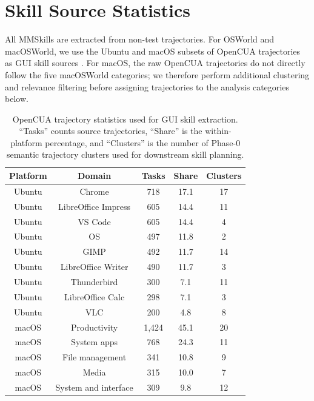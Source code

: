 \section{Skill Source Statistics}
\label{app:skill-source-statistics}

All MMSkills are extracted from non-test trajectories. For OSWorld and macOSWorld, we use the Ubuntu and macOS subsets of OpenCUA trajectories as GUI skill sources \citep{wang2025opencuaopenfoundationscomputeruse}. For macOS, the raw OpenCUA trajectories do not directly follow the five macOSWorld categories; we therefore perform additional clustering and relevance filtering before assigning trajectories to the analysis categories below.

\begin{table}[h]
\centering
\caption{OpenCUA trajectory statistics used for GUI skill extraction. ``Tasks'' counts source trajectories, ``Share'' is the within-platform percentage, and ``Clusters'' is the number of Phase-0 semantic trajectory clusters used for downstream skill planning.}
\label{tab:opencua-source-distribution}
\small
\setlength{\tabcolsep}{6pt}
\begin{tabular}{ccccc}
\toprule
Platform & Domain & Tasks & Share & Clusters \\
\midrule
Ubuntu & Chrome & 718 & 17.1 & 17 \\
Ubuntu & LibreOffice Impress & 605 & 14.4 & 11 \\
Ubuntu & VS Code & 605 & 14.4 & 4 \\
Ubuntu & OS & 497 & 11.8 & 2 \\
Ubuntu & GIMP & 492 & 11.7 & 14 \\
Ubuntu & LibreOffice Writer & 490 & 11.7 & 3 \\
Ubuntu & Thunderbird & 300 & 7.1 & 11 \\
Ubuntu & LibreOffice Calc & 298 & 7.1 & 3 \\
Ubuntu & VLC & 200 & 4.8 & 8 \\
\midrule
macOS & Productivity & 1,424 & 45.1 & 20 \\
macOS & System apps & 768 & 24.3 & 11 \\
macOS & File management & 341 & 10.8 & 9 \\
macOS & Media & 315 & 10.0 & 7 \\
macOS & System and interface & 309 & 9.8 & 12 \\
\bottomrule
\end{tabular}
\end{table}

